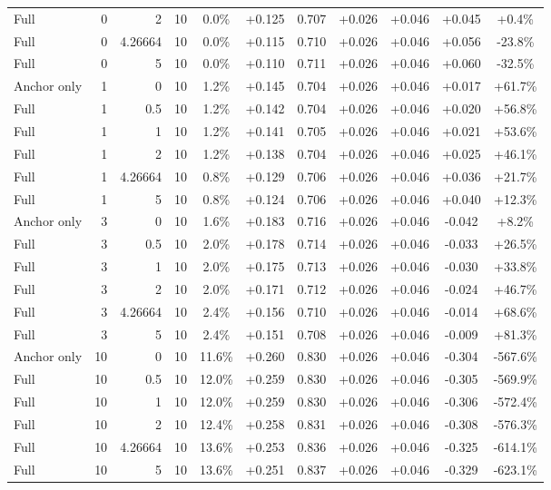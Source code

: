 \begin{table}[htbp]
\begin{tabular}{lrrrccccccc}
Full & 0 & 2 & 10 & 0.0\% & +0.125 & 0.707 & +0.026 & +0.046 & +0.045 & +0.4\% \\
Full & 0 & 4.26664 & 10 & 0.0\% & +0.115 & 0.710 & +0.026 & +0.046 & +0.056 & -23.8\% \\
Full & 0 & 5 & 10 & 0.0\% & +0.110 & 0.711 & +0.026 & +0.046 & +0.060 & -32.5\% \\
Anchor only & 1 & 0 & 10 & 1.2\% & +0.145 & 0.704 & +0.026 & +0.046 & +0.017 & +61.7\% \\
Full & 1 & 0.5 & 10 & 1.2\% & +0.142 & 0.704 & +0.026 & +0.046 & +0.020 & +56.8\% \\
Full & 1 & 1 & 10 & 1.2\% & +0.141 & 0.705 & +0.026 & +0.046 & +0.021 & +53.6\% \\
Full & 1 & 2 & 10 & 1.2\% & +0.138 & 0.704 & +0.026 & +0.046 & +0.025 & +46.1\% \\
Full & 1 & 4.26664 & 10 & 0.8\% & +0.129 & 0.706 & +0.026 & +0.046 & +0.036 & +21.7\% \\
Full & 1 & 5 & 10 & 0.8\% & +0.124 & 0.706 & +0.026 & +0.046 & +0.040 & +12.3\% \\
Anchor only & 3 & 0 & 10 & 1.6\% & +0.183 & 0.716 & +0.026 & +0.046 & -0.042 & +8.2\% \\
Full & 3 & 0.5 & 10 & 2.0\% & +0.178 & 0.714 & +0.026 & +0.046 & -0.033 & +26.5\% \\
Full & 3 & 1 & 10 & 2.0\% & +0.175 & 0.713 & +0.026 & +0.046 & -0.030 & +33.8\% \\
Full & 3 & 2 & 10 & 2.0\% & +0.171 & 0.712 & +0.026 & +0.046 & -0.024 & +46.7\% \\
Full & 3 & 4.26664 & 10 & 2.4\% & +0.156 & 0.710 & +0.026 & +0.046 & -0.014 & +68.6\% \\
Full & 3 & 5 & 10 & 2.4\% & +0.151 & 0.708 & +0.026 & +0.046 & -0.009 & +81.3\% \\
Anchor only & 10 & 0 & 10 & 11.6\% & +0.260 & 0.830 & +0.026 & +0.046 & -0.304 & -567.6\% \\
Full & 10 & 0.5 & 10 & 12.0\% & +0.259 & 0.830 & +0.026 & +0.046 & -0.305 & -569.9\% \\
Full & 10 & 1 & 10 & 12.0\% & +0.259 & 0.830 & +0.026 & +0.046 & -0.306 & -572.4\% \\
Full & 10 & 2 & 10 & 12.4\% & +0.258 & 0.831 & +0.026 & +0.046 & -0.308 & -576.3\% \\
Full & 10 & 4.26664 & 10 & 13.6\% & +0.253 & 0.836 & +0.026 & +0.046 & -0.325 & -614.1\% \\
Full & 10 & 5 & 10 & 13.6\% & +0.251 & 0.837 & +0.026 & +0.046 & -0.329 & -623.1\% \\

\end{tabular}
\end{table}
